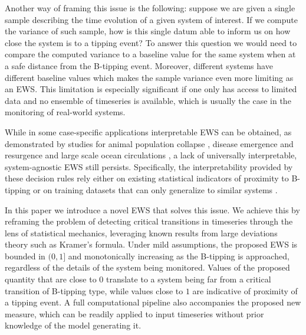 \documentclass[a4paper,fleqn]{cas-sc}
\begin{document}
Another way of framing this issue is the following: suppose we are given a single sample describing the time evolution of a given system of interest.
If we compute the variance of such sample, how is this single datum able to inform us on how close the system is to a tipping event?
To answer this question we would need to compare the computed variance to a baseline value for the same system when at a safe distance from the B-tipping event.
Moreover, different systems have different baseline values which makes the sample variance even more limiting as an EWS.
This limitation is especially significant if one only has access to limited data and no ensemble of timeseries is available, which is usually the case in the monitoring of real-world systems.

While in some case-specific applications interpretable EWS can be obtained, as demonstrated by studies for animal population collapse \cite{Drake2010}, disease emergence and resurgence \cite{Brett2020,Harris2020} and large scale ocean circulations \cite{Rodal2022}, a lack of universally interpretable, system-agnostic EWS still persists.
Specifically, the interpretability provided by these decision rules rely either on existing statistical indicators of proximity to B-tipping \cite{Drake2010,Harris2020} or on training datasets that can only generalize to similar systems \cite{Brett2020}.

In this paper we introduce a novel EWS that solves this issue. 
We achieve this by reframing the problem of detecting critical transitions in timeseries through the lens of statistical mechanics, leveraging known results from large deviations theory such as Kramer's formula.
Under mild assumptions, the proposed EWS is bounded in $(0,1]$ and monotonically increasing as the B-tipping is approached, regardless of the details of the system being monitored. 
Values of the proposed quantity that are close to $0$ translate to a system being far from a critical transition of B-tipping type, while values close to $1$ are indicative of proximity of a tipping event.
A full computational pipeline also accompanies the proposed new measure, which can be readily applied to input timeseries without prior knowledge of the model generating it.
\end{document}
